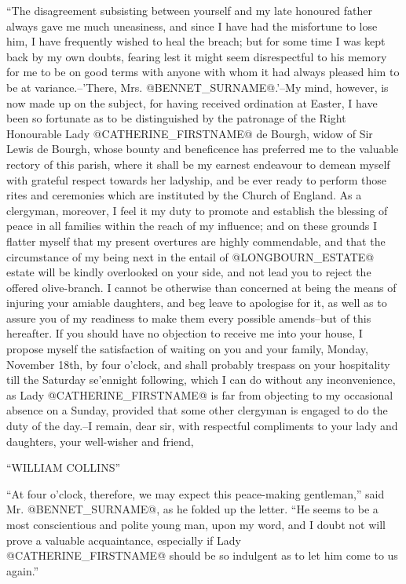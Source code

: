 ``The disagreement subsisting between yourself and my late honoured
father always gave me much uneasiness, and since I have had the
misfortune to lose him, I have frequently wished to heal the breach; but
for some time I was kept back by my own doubts, fearing lest it might
seem disrespectful to his memory for me to be on good terms with anyone
with whom it had always pleased him to be at variance.--'There, Mrs.
@BENNET_SURNAME@.'--My mind, however, is now made up on the subject, for having
received ordination at Easter, I have been so fortunate as to be
distinguished by the patronage of the Right Honourable Lady @CATHERINE_FIRSTNAME@ de
Bourgh, widow of Sir Lewis de Bourgh, whose bounty and beneficence has
preferred me to the valuable rectory of this parish, where it shall be
my earnest endeavour to demean myself with grateful respect towards her
ladyship, and be ever ready to perform those rites and ceremonies which
are instituted by the Church of England. As a clergyman, moreover, I
feel it my duty to promote and establish the blessing of peace in
all families within the reach of my influence; and on these grounds I
flatter myself that my present overtures are highly commendable, and
that the circumstance of my being next in the entail of @LONGBOURN_ESTATE@ estate
will be kindly overlooked on your side, and not lead you to reject the
offered olive-branch. I cannot be otherwise than concerned at being the
means of injuring your amiable daughters, and beg leave to apologise for
it, as well as to assure you of my readiness to make them every possible
amends--but of this hereafter. If you should have no objection to
receive me into your house, I propose myself the satisfaction of waiting
on you and your family, Monday, November 18th, by four o'clock, and
shall probably trespass on your hospitality till the Saturday se'ennight
following, which I can do without any inconvenience, as Lady @CATHERINE_FIRSTNAME@
is far from objecting to my occasional absence on a Sunday, provided
that some other clergyman is engaged to do the duty of the day.--I
remain, dear sir, with respectful compliments to your lady and
daughters, your well-wisher and friend,

``WILLIAM COLLINS''

``At four o'clock, therefore, we may expect this peace-making gentleman,''
said Mr. @BENNET_SURNAME@, as he folded up the letter. ``He seems to be a most
conscientious and polite young man, upon my word, and I doubt not will
prove a valuable acquaintance, especially if Lady @CATHERINE_FIRSTNAME@ should be so
indulgent as to let him come to us again.''

